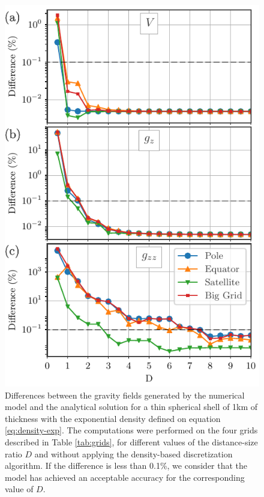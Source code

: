 \documentclass[extra]{gji}
\begin{document}
\begin{figure}
\centering
\includegraphics[width=0.9\linewidth]{figures/exponential-D-thin.pdf}
\caption{
    Differences between the gravity fields generated by the numerical model and the analytical solution for a thin spherical shell of 1km of thickness with the exponential density defined on equation \ref{eq:density-exp}. The computations were performed on the four grids described in Table \ref{tab:grids}, for different values of the distance-size ratio $D$ and without applying the density-based discretization algorithm. If the difference is less than 0.1\%, we consider that the model has achieved an acceptable accuracy for the corresponding value of $D$.
}
\label{fig:D-exp-thin}
\end{figure}
\end{document}
